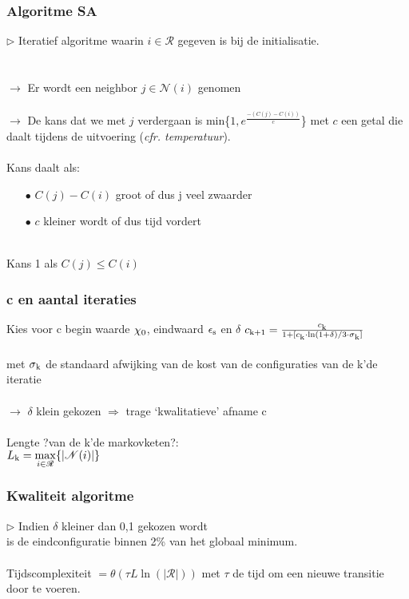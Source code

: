 \documentclass
   [kulak] %
   {kulakbeamer}
\begin{document}
\begin{frame}
	\frametitle{Algoritme SA}
	$\triangleright$ Iteratief algoritme waarin $i \in \mathscr{R}$ gegeven is bij de initialisatie. \\~\\~\\ \pause
	$\rightarrow$ Er wordt een neighbor $j \in \mathscr{N}(i)$ genomen \\~\\ \pause
	$\rightarrow$ De kans dat we met $j$ verdergaan is min\{$1,e^{\frac{-(C(j)-C(i))}{c}}$\} met $c$ een getal die daalt tijdens de uitvoering (\textit{cfr. temperatuur}).\\~\\
	\pause
	Kans daalt als:
	\begin{itemize}
		\item[$\bullet$] $C(j)-C(i)$ groot of dus j veel zwaarder
		
		\item[$\bullet$] $c$ kleiner wordt of dus tijd vordert
		
		
	\end{itemize}
	\pause
	~\\Kans 1 als $C(j) \leqslant C(i)$
	
	
\end{frame}

\begin{frame}
	\frametitle{c en aantal iteraties}
	Kies voor c begin waarde $\chi\textsubscript{0}$, eindwaard $\epsilon\textsubscript{s}$ en $\delta$
	$c\textsubscript{k+1} = \frac{c\textsubscript{k}}{1 + [c\textsubscript{k}\cdot \ln(1 + \delta)/3\cdot \sigma\textsubscript{k}]}$ \\~\\ met $\sigma\textsubscript{k}$ de standaard afwijking van de kost van de configuraties van de k'de iteratie \\~\\\pause$\rightarrow$ $\delta$ klein gekozen $\Rightarrow$ trage `kwalitatieve' afname c 
	\\~\\\pause
	Lengte ?van de k'de markovketen?:\\
	$L\textsubscript{k} = \displaystyle \max_{i \in \mathscr{R}}\{|\mathscr{N}(i)|\}$
\end{frame}

\begin{frame}
	\frametitle{Kwaliteit algoritme}
	
	$\triangleright$ Indien $\delta$ kleiner dan 0,1 gekozen wordt\\
	is de eindconfiguratie binnen 2\% van het globaal minimum. \\~\\
	Tijdscomplexiteit $= \mathscr{\theta}(\tau L\ln(|\mathscr{R}|))$ met $\tau$ de tijd om een nieuwe transitie door te voeren.
	
\end{frame}
\end{document}
